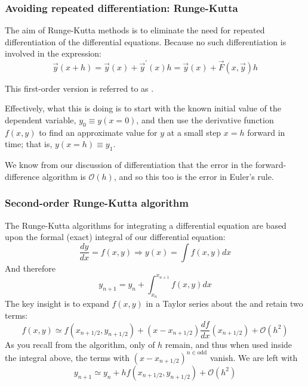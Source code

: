 \documentclass[hyperref={colorlinks=true}]{beamer}
\begin{document}
\begin{frame}%
  \frametitle{Avoiding repeated differentiation: Runge-Kutta}

  The aim of Runge-Kutta methods is to eliminate the need for repeated differentiation of the differential equations. Because no such differentiation is involved in the  expression:
  \begin{equation}
    \vec{y}(x + h) = \vec{y}(x) + \vec{y}^{\prime}(x)h = \vec{y}(x) + \vec{F}(x, \vec{y})h
  \end{equation}
  
  This first-order version is referred to as .
  
  \mysp
  
  Effectively, what this is doing is to start with the known initial value of the dependent variable, $y_0 \equiv y(x = 0)$, and then use the derivative function $f(x,y)$ to find an approximate value for $y$ at a small step $x = h$ forward in time; that is, $y(x = h) \equiv y_1$. 
  
  \mysp
  
  We know from our discussion of differentiation that the error in the forward-difference algorithm is $\mathcal{O}(h)$, and so this too is the error in Euler's rule.

\end{frame}


\begin{frame}%
  \frametitle{Second-order Runge-Kutta algorithm} 

  The Runge-Kutta algorithms for integrating a differential equation are based upon the formal (exact) integral of our differential equation:
  \begin{equation}
    \frac{dy}{dx} = f(x,y) \Rightarrow y(x) = \int f(x,y) dx
  \end{equation}
  And therefore
  \begin{equation}
    y_{n+1} = y_{n} + \int_{x_n}^{x_{n+1}} f(x,y) dx
  \end{equation}
  The key insight is to expand $f(x,y)$ in a Taylor series about the  and retain two
terms:
  \begin{equation}
    f(x,y) \simeq f(x_{n+1/2} , y_{n+1/2}) + (x - x_{n+1/2}) \frac{df}{dx}(x_{n+1/2}) + \mathcal{O}(h^2)
  \end{equation}
  As you recall from the  algorithm, only  of $h$ remain, and thus when used inside the integral above, the terms with $(x - x_{n+1/2})^{n\in\mathrm{odd}}$ vanish. We are left with
  \begin{equation}
    y_{n+1} \simeq y_{n} + h f(x_{n+1/2} , y_{n+1/2}) + \mathcal{O}(h^2) 
  \end{equation}

\end{frame}
\end{document}

